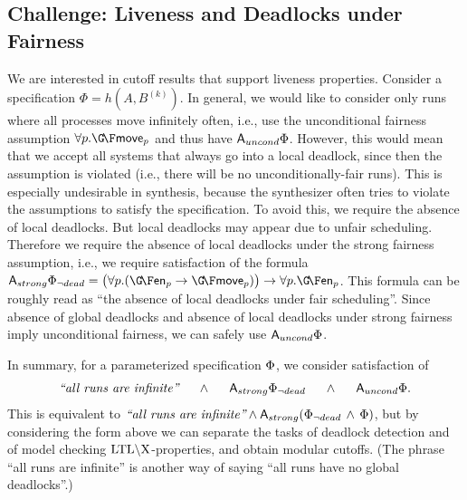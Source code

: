 \subsection*{Challenge: Liveness and Deadlocks under Fairness}
We are interested in cutoff results that support liveness properties.
Consider a specification $\Phi=h(A,B^{(k)})$.
In general, we would like to consider only runs where all processes move infinitely often,
i.e.,
use the unconditional fairness assumption $\forall{p}. \GF \sched_p$ and thus have ${\operatorname{\mathsf{A}}}_{uncond}\Phi$.
However, this would mean that we accept all systems that always go into a local deadlock,
since then the assumption is violated (i.e., there will be no unconditionally-fair runs).
This is especially undesirable in synthesis, because the synthesizer often tries to violate the assumptions to satisfy the specification.
To avoid this,
we require the absence of local deadlocks.
But local deadlocks may appear due to unfair scheduling.
Therefore we require the absence of local deadlocks under the strong fairness assumption,
i.e., we require satisfaction of the formula
$\A_{strong} \spec_{\neg dead}=\big(\forall{p}. (\GF \enabled_p \impl \GF \sched_p)\big) \impl \forall{p}. \GF\enabled_p$.
This formula can be roughly read as ``the absence of local deadlocks under fair scheduling''.
Since absence of global deadlocks and absence of local deadlocks under strong fairness imply unconditional fairness,
we can safely use ${\operatorname{\mathsf{A}}}_{uncond}\Phi$.


In summary, for a parameterized specification $\Phi$, we consider satisfaction of
\[
\begin{array}{lllll}
\textit{``all runs are infinite''} &~~\land~~& {\operatorname{\mathsf{A}}}_{strong} \Phi_{\neg dead} & ~~\land~~ & {\operatorname{\mathsf{A}}}_{uncond} \Phi.
\end{array}
\]
%
This is equivalent to $\textit{``all runs are infinite''} \land {\ensuremath{\operatorname{\mathsf{A}}}}_{strong} (\Phi_{\neg dead} \,\land\, \Phi)$, but by considering the form above we can separate the tasks of deadlock detection and of model checking $\text{LTL}\backslash\text{X}$-properties, and obtain modular cutoffs. 
(The phrase ``all runs are infinite'' is another way of saying ``all runs have no global deadlocks''.)


